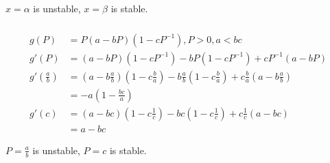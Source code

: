 \documentclass{article}
\begin{document}
$x = \alpha$ is unstable, $x = \beta$ is stable.

\setcounter{subsubsection}{8}
\subsubsection{}

\begin{align*}
  g(P)                         & = P (a - b P) (1 - c P^{-1}), P > 0, a < b c                                                                                                                          \\
  g'(P)                        & = (a - b P) (1 - c P^{-1}) - b P (1 - c P^{-1}) + c P^{-1} (a - b P)                                                                                                  \\
  g'\left( \frac{a}{b} \right) & = \left( a - b \frac{a}{b} \right) \left( 1 - c \frac{b}{a} \right) - b \frac{a}{b} \left( 1 - c \frac{b}{a} \right) + c \frac{b}{a} \left( a - b \frac{a}{b} \right) \\
                               & = -a \left( 1 - \frac{b c}{a} \right)                                                                                                                                 \\
  g'(c)                        & = (a - b c) \left( 1 - c \frac{1}{c} \right) - b c \left( 1 - c \frac{1}{c} \right) + c \frac{1}{c} (a - b c)                                                         \\
                               & = a - b c
\end{align*}

$P = \frac{a}{b}$ is unstable, $P = c$ is stable.

\setcounter{subsubsection}{10}
\subsubsection{}
\end{document}
